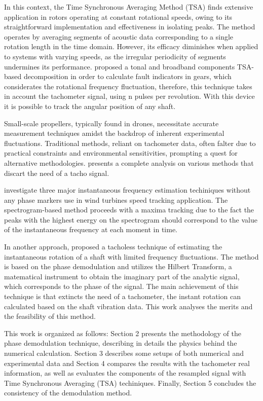 \documentclass[10pt,fleqn,a4paper,twoside]{article}
\begin{document}
In this context, the Time Synchronous Averaging Method (TSA) \citep{MCFADDEN1987173} finds extensive application in rotors operating at constant rotational speeds, owing to its straightforward implementation and effectiveness in isolating peaks. The method operates by averaging segments of acoustic data corresponding to a single rotation length in the time domain. However, its efficacy diminishes when applied to systems with varying speeds, as the irregular periodicity of segments undermines its performance. \cite{SHARMA2016560} proposed a tonal and broadband components TSA-based decomposition in order to calculate fault indicators in gears, which considerates the rotational frequency fluctuation, therefore, this technique takes in account the tachometer signal, using n pulses per revolution. With this device it is possible to track the angular position of any shaft. 

Small-scale propellers, typically found in drones, necessitate accurate measurement techniques amidst the backdrop of inherent experimental fluctuations. Traditional methods, reliant on tachometer data, often falter due to practical constraints and environmental sensitivities, prompting a quest for alternative methodologies. \cite{article} presents a complete analysis on various methods that discart the need of a tacho signal.

\cite{Urbanek2011ComparisonOA} investigate three major instantaneous frequency estimation techiniques without any phase markers use in wind turbines speed tracking application. The spectrogram-based method proceeds with a maxima tracking due to the fact the peaks with the highest energy on the spectrogram should correspond to the value of the instantaneous frequency at each moment in time.

In another approach,\cite{BONNARDOT2005766} proposed a tacholess technique of estimating the instantaneous rotation of a shaft with limited frequency fluctuations. The method is based on the phase demodulation and utilizes the Hilbert Transform, a matematical instrument to obtain the imaginary part of the analytic signal, which corresponds to the phase of the signal. The main achievement of this technique is that extincts the need of a tachometer, the instant rotation can calculated based on the shaft vibration data. This work analyses the merits and the feasibility of this method.

This work is organized as follows: Section 2 presents the methodology of the phase demodulation technique, describing in details the physics behind the numerical calculation. Section 3 describes some setups of both numerical and experimental data and Section 4 compares the results with the tachometer real information, as well as evaluates the components of the resampled signal with Time Synchronous Averaging (TSA) techiniques. Finally, Section 5 concludes the consistency of the demodulation method.
\end{document}
